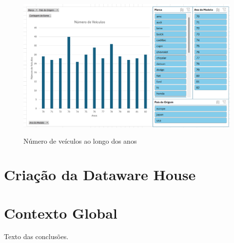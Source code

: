 \documentclass[a4paper]{article}
\begin{document}
\begin{figure}[h!]
    \centering
    \includegraphics[width=1\textwidth]{Recursos/NVeiculosGrafico.png} %
    \vspace{0.5cm}
    \label{fig:nveig}
    \caption{Número de veículos ao longo dos anos}
\end{figure}
\section{Criação da Dataware House}\label{dwh}


\section{Contexto Global}\label{cg}

Texto das conclusões.

\newpage
\renewcommand{\refname}{Bibliografia} %
\renewcommand{\bibname}{Bibliografia} %
\printbibliography
\end{document}

